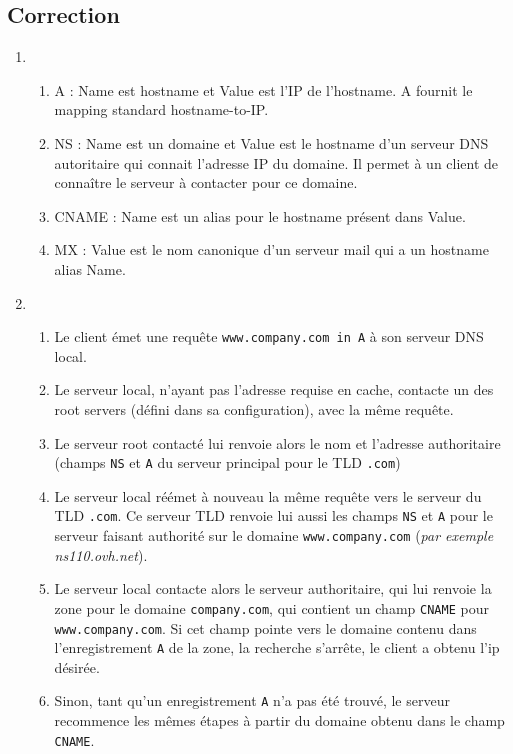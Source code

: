 \documentclass[a4paper, 11pt, titlepage]{article}
\begin{document}
\subsection{Correction}
\begin{enumerate}[label=(\alph*)]
  \item
  \begin{enumerate}[label=(\roman*)]
    \item A : Name est hostname et Value est l'IP de l'hostname. A fournit le mapping standard hostname-to-IP.
    \item NS : Name est un domaine et Value est le hostname d'un serveur DNS autoritaire qui connait l'adresse IP du domaine. Il permet à un client de connaître le serveur à contacter pour ce domaine.
    \item CNAME : Name est un alias pour le hostname présent dans Value.
    \item MX : Value est le nom canonique d'un serveur mail qui a un hostname alias Name.
  \end{enumerate}

  \item
  \begin{enumerate}[label=(\roman*)]
    \item Le client émet une requête \texttt{www.company.com in A} à son serveur DNS local. 
    \item Le serveur local, n'ayant pas l'adresse requise en cache, contacte un des root servers (défini dans sa configuration), avec la même requête.
    \item Le serveur root contacté lui renvoie alors le nom et l'adresse authoritaire (champs \texttt{NS} et \texttt{A} du serveur principal pour le TLD \texttt{.com})
    \item Le serveur local réémet à nouveau la même requête vers le serveur du TLD \texttt{.com}. Ce serveur TLD renvoie lui aussi les champs \texttt{NS} et \texttt{A} pour le serveur faisant authorité sur le domaine \texttt{www.company.com} (\textit{par exemple ns110.ovh.net}).
    \item Le serveur local contacte alors le serveur authoritaire, qui lui renvoie la zone pour le domaine \texttt{company.com}, qui contient un champ \texttt{CNAME} pour \texttt{www.company.com}. Si cet champ pointe vers le domaine contenu dans l'enregistrement \texttt{A} de la zone, la recherche s'arrête, le client a obtenu l'ip désirée.
    \item Sinon, tant qu'un enregistrement \texttt{A} n'a pas été trouvé, le serveur recommence les mêmes étapes à partir du domaine obtenu dans le champ \texttt{CNAME}.
  \end{enumerate}

\end{enumerate}
\end{document}
